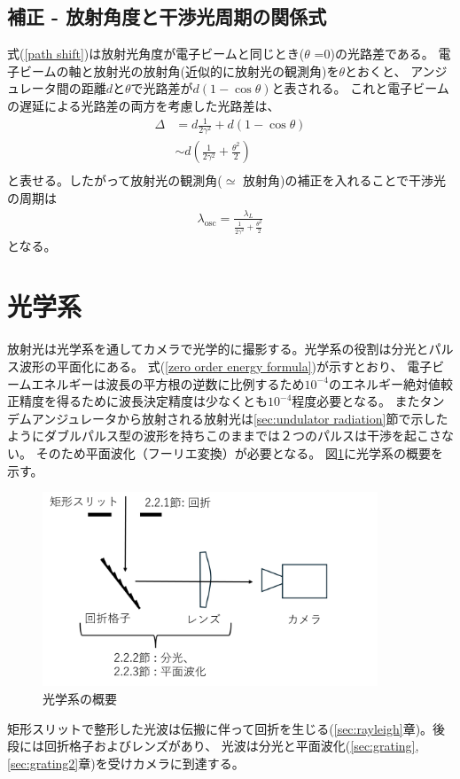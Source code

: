 \documentclass[a4paper,11pt,uplatex]{jsbook}
\begin{document}
\subsection{補正 - 放射角度と干渉光周期の関係式}
式(\ref*{path shift})は放射光角度が電子ビームと同じとき($\theta$ =0)の光路差である。
電子ビームの軸と放射光の放射角(近似的に放射光の観測角)を$\theta$とおくと、
アンジュレータ間の距離$d$と$\theta$で光路差が$d(1-\cos{\theta})$と表される。
これと電子ビームの遅延による光路差の両方を考慮した光路差は、
\begin{eqnarray}
  \Delta &= d\frac{1}{2\gamma^2} + d(1 - \cos{\theta}) \\
        &\sim d(\frac{1}{2\gamma^2} + \frac{\theta^2}{2})\\
\end{eqnarray}
と表せる。したがって放射光の観測角($\simeq$ 放射角)の補正を入れることで干渉光の周期は
\begin{eqnarray}
  \lambda_{\text{osc}} = \frac{\lambda_L}{\frac{1}{2\gamma^2} + \frac{\theta^2}{2}}
\end{eqnarray}
となる。



\section{光学系}\label{sec:optics}
放射光は光学系を通してカメラで光学的に撮影する。光学系の役割は分光とパルス波形の平面化にある。
式(\ref{zero order energy formula})が示すとおり、
電子ビームエネルギーは波長の平方根の逆数に比例するため$10^{-4}$のエネルギー絶対値較正精度を得るために波長決定精度は少なくとも$10^{-4}$程度必要となる。
またタンデムアンジュレータから放射される放射光は\ref{sec:undulator radiation}節で示したようにダブルパルス型の波形を持ちこのままでは２つのパルスは干渉を起こさない。
そのため平面波化（フーリエ変換）が必要となる。
図\ref{optics_schematic}に光学系の概要を示す。
\begin{figure}[h]
  \centering
  \includegraphics[width=10cm]{image/2-opticsshematic.png}
  \caption{光学系の概要}
  \label{optics_schematic}
\end{figure}
矩形スリットで整形した光波は伝搬に伴って回折を生じる(\ref{sec:rayleigh}章)。後段には回折格子およびレンズがあり、
光波は分光と平面波化(\ref{sec:grating},\ref{sec:grating2}章)を受けカメラに到達する。
\end{document}
